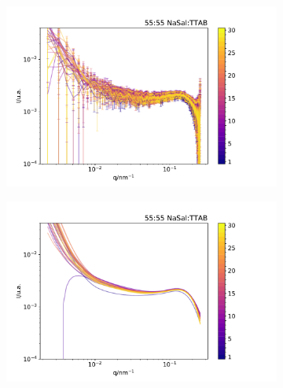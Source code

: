 \begin{figure}[h]
    \begin{subfigure}[t]{0.5\textwidth}
        \centering
        \includegraphics[width=\textwidth]{imagens/saxs/TR_saxs_55_55_dados.pdf}
        \caption{}
        \label{fig:saxs_tr_}
    \end{subfigure}%
    \begin{subfigure}[t]{0.5\textwidth}
        \centering
        \includegraphics[width=\textwidth]{imagens/saxs/TR_saxs_55_55_ajuste.pdf}
        \caption{}
        \label{fig:saxs_tr_}
    \end{subfigure}
    \caption{}
    \label{fig:}
\end{figure} 

